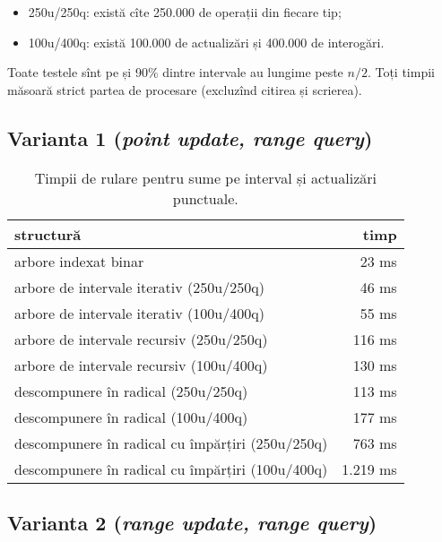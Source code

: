 \begin{itemize}
  \item 250u/250q: există cîte 250.000 de operații din fiecare tip;
  \item 100u/400q: există 100.000 de actualizări și 400.000 de interogări.
\end{itemize}

Toate testele sînt pe  și 90\% dintre intervale au lungime peste $n/2$. Toți timpii măsoară strict partea de procesare (excluzînd citirea și scrierea).

\subsection{Varianta 1 (\textit{point update, range query})}

\begin{table}[!htbp]
  \centering
  \begin{tabular}{lr}
    \textbf{structură} & \textbf{timp} \\
    \hline
    arbore indexat binar & 23 ms \\
    arbore de intervale iterativ (250u/250q) & 46 ms \\
    arbore de intervale iterativ (100u/400q) & 55 ms \\
    arbore de intervale recursiv (250u/250q) & 116 ms \\
    arbore de intervale recursiv (100u/400q) & 130 ms \\
    descompunere în radical (250u/250q) & 113 ms \\
    descompunere în radical (100u/400q) & 177 ms \\
    descompunere în radical cu împărțiri (250u/250q) & 763 ms \\
    descompunere în radical cu împărțiri (100u/400q) & 1.219 ms \\
    \hline
  \end{tabular}

  \caption{Timpii de rulare pentru sume pe interval și actualizări punctuale.}
\end{table}

\subsection{Varianta 2 (\textit{range update, range query})}

